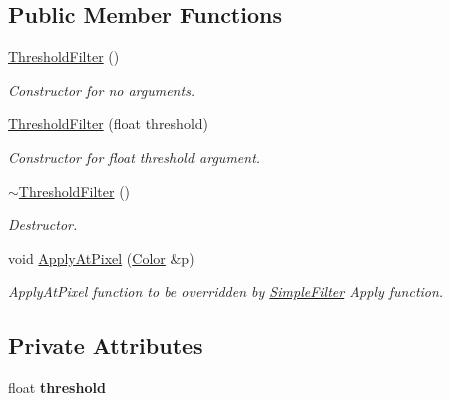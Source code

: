 \subsection*{Public Member Functions}
\begin{DoxyCompactItemize}
\item 
\mbox{\label{classThresholdFilter_a12ba3301d876524d9790d20d4125774a}} 
\hyperlink{classThresholdFilter_a12ba3301d876524d9790d20d4125774a}{Threshold\+Filter} ()
\begin{DoxyCompactList}\small\item\em Constructor for no arguments. \end{DoxyCompactList}\item 
\mbox{\label{classThresholdFilter_ac13253e54ab2cb9470c912dfc90c71e9}} 
\hyperlink{classThresholdFilter_ac13253e54ab2cb9470c912dfc90c71e9}{Threshold\+Filter} (float threshold)
\begin{DoxyCompactList}\small\item\em Constructor for float threshold argument. \end{DoxyCompactList}\item 
\mbox{\label{classThresholdFilter_a5f7d71d8c0e78f533d9b1e4f5c43352e}} 
\hyperlink{classThresholdFilter_a5f7d71d8c0e78f533d9b1e4f5c43352e}{$\sim$\+Threshold\+Filter} ()
\begin{DoxyCompactList}\small\item\em Destructor. \end{DoxyCompactList}\item 
\mbox{\label{classThresholdFilter_a96ea6f3cc9e8c07ea1296dd5fb0088b5}} 
void \hyperlink{classThresholdFilter_a96ea6f3cc9e8c07ea1296dd5fb0088b5}{Apply\+At\+Pixel} (\hyperlink{classColor}{Color} \&p)
\begin{DoxyCompactList}\small\item\em Apply\+At\+Pixel function to be overridden by \hyperlink{classSimpleFilter}{Simple\+Filter} Apply function. \end{DoxyCompactList}\end{DoxyCompactItemize}
\subsection*{Private Attributes}
\begin{DoxyCompactItemize}
\item 
\mbox{\label{classThresholdFilter_a70ebcb3343ab432b15f477bb882be3fb}} 
float {\bfseries threshold}
\end{DoxyCompactItemize}


